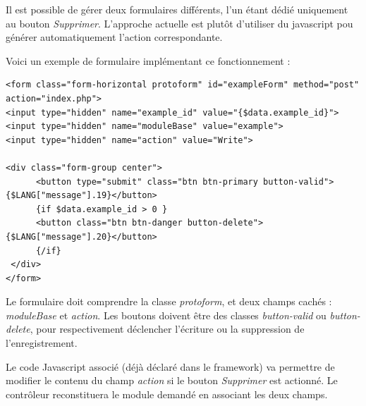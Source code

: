 Il est possible de gérer deux formulaires différents, l'un étant dédié uniquement au bouton \textit{Supprimer}. L'approche actuelle est plutôt d'utiliser du javascript pou générer automatiquement l'action correspondante.

Voici un exemple de formulaire implémentant ce fonctionnement :

\begin{lstlisting}
<form class="form-horizontal protoform" id="exampleForm" method="post" action="index.php">
<input type="hidden" name="example_id" value="{$data.example_id}">
<input type="hidden" name="moduleBase" value="example">
<input type="hidden" name="action" value="Write">

<div class="form-group center">
      <button type="submit" class="btn btn-primary button-valid">{$LANG["message"].19}</button>
      {if $data.example_id > 0 }
      <button class="btn btn-danger button-delete">{$LANG["message"].20}</button>
      {/if}
 </div>
</form>
\end{lstlisting}

Le formulaire doit comprendre la classe \textit{protoform}, et deux champs cachés : \textit{moduleBase} et \textit{action}. Les boutons doivent être des classes \textit{button-valid} ou \textit{button-delete}, pour respectivement déclencher l'écriture ou la suppression de l'enregistrement.

Le code Javascript associé (déjà déclaré dans le framework) va permettre de modifier le contenu du champ \textit{action} si le bouton \textit{Supprimer} est actionné. Le contrôleur reconstituera le module demandé en associant les deux champs.